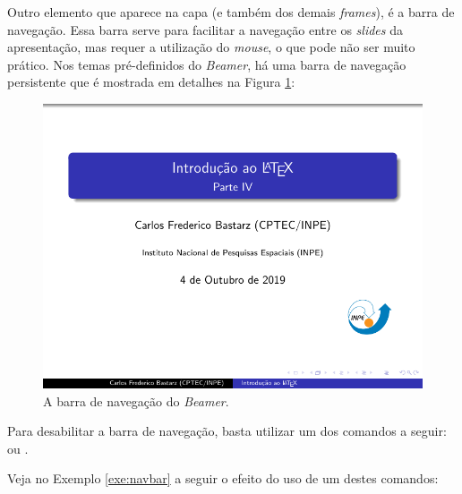 Outro elemento que aparece na capa (e também dos demais \textit{frames}), é a barra de navegação. Essa barra serve para facilitar a navegação entre os \textit{slides} da apresentação, mas requer a utilização do \textit{mouse}, o que pode não ser muito prático. Nos temas pré-definidos do \textit{Beamer}, há uma barra de navegação persistente que é mostrada em detalhes na Figura \ref{fig:navbar}:

\begin{figure}[H]
\caption{A barra de navegação do \textit{Beamer}.}
\vspace{6mm}
  \begin{center}
    \includegraphics[trim={8cm 0.35cm 0 8.75cm}, clip, scale=3]{./docs/figs/beamer-capa.pdf}
  \end{center}
\vspace{4mm}
\label{fig:navbar}
\end{figure}

Para desabilitar a barra de navegação, basta utilizar um dos comandos a seguir: \texttt{\beamertemplatenavigationsymbolsempty} ou \texttt{}.

Veja no Exemplo \ref{exe:navbar} a seguir o efeito do uso de um destes comandos:

